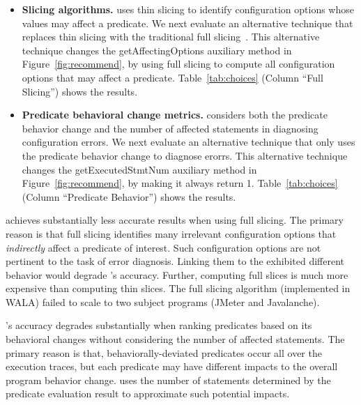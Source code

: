 \begin{itemize}
\item \textbf{Slicing algorithms.} \ourtool
uses thin slicing to identify configuration options
whose values may affect a predicate. We next evaluate
an alternative technique that replaces thin slicing with
the traditional full slicing~\cite{Horwitz:1988}.
This alternative technique changes the getAffectingOptions
auxiliary method in Figure~\ref{fig:recommend}, by using full slicing to compute all
configuration options that may affect a predicate.
Table~\ref{tab:choices} (Column ``Full Slicing'') shows the results.

\item \textbf{Predicate behavioral change metrics.}
\ourtool considers both the predicate behavior change
and the number of affected statements in diagnosing
configuration errors. We next evaluate an alternative technique
that only uses the predicate behavior change to diagnose erorrs.
This alternative technique
changes the getExecutedStmtNum auxiliary method in
Figure~\ref{fig:recommend}, by making it always return 1.
Table~\ref{tab:choices} (Column ``Predicate Behavior'') shows
the results. 
\end{itemize}

\ourtool achieves substantially less accurate results when
using full slicing. The primary reason is that full slicing
identifies many irrelevant configuration options that \textit{indirectly}
affect a predicate of interest. Such configuration options
are not pertinent to the task of error diagnosis. Linking them
to the exhibited different behavior would degrade
\ourtool's accuracy. Further, computing full slices is much
more expensive than computing thin slices. 
The full slicing algorithm (implemented in WALA) failed to scale
to two subject programs (JMeter and Javalanche).


\ourtool's accuracy degrades substantially when ranking
predicates based on its behavioral changes without considering
the number of affected statements.
The primary reason is that, 
behaviorally-deviated predicates occur all over the execution traces,
but each predicate
may have different impacts to the overall program behavior change.
\ourtool uses the number of statements determined by the predicate
evaluation result to approximate such potential impacts.


